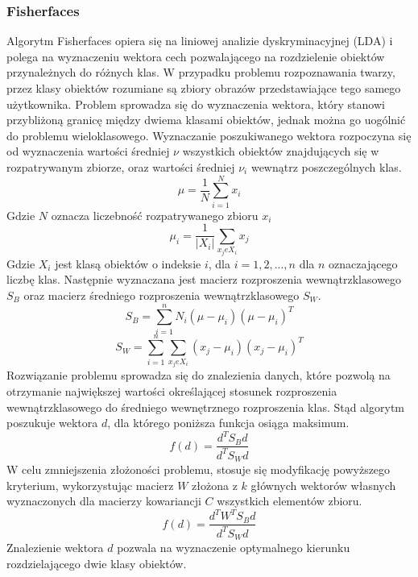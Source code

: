 \subsubsection{Fisherfaces} \label{fisher}
Algorytm Fisherfaces opiera się na liniowej analizie dyskryminacyjnej (LDA) i polega na wyznaczeniu wektora cech pozwalającego na rozdzielenie obiektów przynależnych do różnych klas. W przypadku problemu rozpoznawania twarzy, przez klasy obiektów rozumiane są zbiory obrazów przedstawiające tego samego użytkownika. Problem sprowadza się do wyznaczenia wektora, który stanowi przybliżoną granicę między dwiema klasami obiektów, jednak można go uogólnić do problemu wieloklasowego.
Wyznaczanie poszukiwanego wektora rozpoczyna się od wyznaczenia wartości średniej $\nu$ wszystkich obiektów znajdujących się w rozpatrywanym zbiorze, oraz wartości średniej $\nu_{i}$ wewnątrz poszczególnych klas. 
$$
\mu=\frac{1}{N}\sum_{i=1}^{N}x_{i}
$$
Gdzie $N$ oznacza liczebność rozpatrywanego zbioru $x_{i}$
$$
\mu_{i}=\frac{1}{|X_{i}|}\sum_{x_{j}eX_{i}}x_{j}
$$
Gdzie $X_{i}$ jest klasą obiektów o indeksie $i$, dla $i=1,2,...,n$ dla $n$ oznaczającego liczbę klas. Następnie wyznaczana jest macierz rozproszenia wewnątrzklasowego $S_{B}$ oraz macierz średniego rozproszenia wewnątrzklasowego $S_{W}$.
$$
S_{B}=\sum_{i=1}^{n}N_{i}(\mu-\mu_{i})(\mu-\mu_{i})^{T}
$$
$$
S_{W}=\sum_{i=1}^{n}\sum_{x_{j}eX_{i}}(x_{j}-\mu_{i})(x_{j}-\mu_{i})^{T}
$$
Rozwiązanie problemu sprowadza się do znalezienia danych, które pozwolą na otrzymanie największej wartości określającej stosunek rozproszenia wewnątrzklasowego do średniego wewnętrznego rozproszenia klas. Stąd algorytm poszukuje wektora $d$, dla którego poniższa funkcja osiąga maksimum.
$$
f(d)=\frac{d^{T}S_{B}d}{d^{T}S_{W}d}
$$
W celu zmniejszenia złożoności problemu, stosuje się modyfikację powyższego kryterium, wykorzystując macierz $W$ złożona z $k$ głównych wektorów własnych wyznaczonych dla macierzy kowariancji $C$ wszystkich elementów zbioru.
$$
f(d)=\frac{d^{T}W^{T}S_{B}d}{d^{T}S_{W}d}
$$
Znalezienie wektora $d$ pozwala na wyznaczenie optymalnego kierunku rozdzielającego dwie klasy obiektów.

